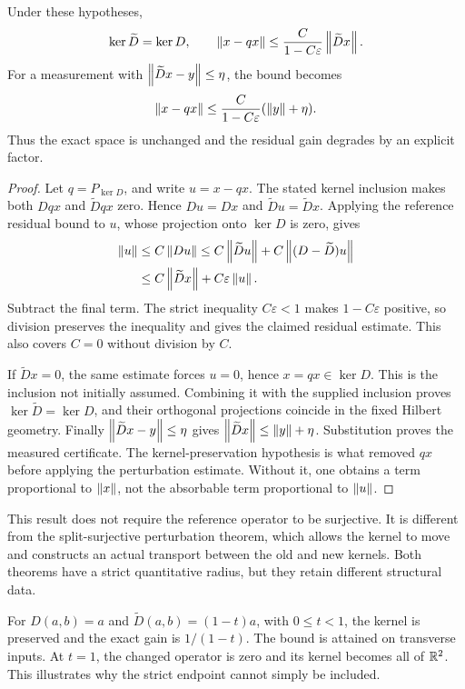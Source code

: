 \begin{theorem}\label{KS70}
Under these hypotheses,
\[
 \ker\widetilde D=\ker D,
 \qquad
 \left\lVert x-qx\right\rVert\le\frac{C}{1-C\varepsilon}\left\lVert\widetilde D x\right\rVert.
\]
For a measurement with \(\left\lVert\widetilde D x-y\right\rVert\le\eta\), the bound becomes
\[
 \left\lVert x-qx\right\rVert\le\frac{C}{1-C\varepsilon}(\left\lVert y\right\rVert+\eta).
\]
Thus the exact space is unchanged and the residual gain degrades by an explicit factor.
\end{theorem}
\begin{proof}
Let \(q=P_{\ker D}\), and write \(u=x-qx\). The stated kernel inclusion makes both \(Dqx\) and \(\widetilde Dqx\) zero. Hence \(Du=Dx\) and \(\widetilde Du=\widetilde Dx\). Applying the reference residual bound to \(u\), whose projection onto \(\ker D\) is zero, gives
\[
 \begin{aligned}
 \left\lVert u\right\rVert&\le C\left\lVert Du\right\rVert
 \le C\left\lVert\widetilde Du\right\rVert+C\left\lVert(D-\widetilde D)u\right\rVert\\
 &\le C\left\lVert\widetilde Dx\right\rVert+C\varepsilon\left\lVert u\right\rVert.
 \end{aligned}
\]
Subtract the final term. The strict inequality \(C\varepsilon<1\) makes \(1-C\varepsilon\) positive, so division preserves the inequality and gives the claimed residual estimate. This also covers \(C=0\) without division by \(C\).

If \(\widetilde Dx=0\), the same estimate forces \(u=0\), hence \(x=qx\in\ker D\). This is the inclusion not initially assumed. Combining it with the supplied inclusion proves \(\ker\widetilde D=\ker D\), and their orthogonal projections coincide in the fixed Hilbert geometry. Finally \(\left\lVert\widetilde Dx-y\right\rVert\le\eta\) gives \(\left\lVert\widetilde Dx\right\rVert\le\left\lVert y\right\rVert+\eta\). Substitution proves the measured certificate. The kernel-preservation hypothesis is what removed \(qx\) before applying the perturbation estimate. Without it, one obtains a term proportional to \(\left\lVert x\right\rVert\), not the absorbable term proportional to \(\left\lVert u\right\rVert\).
\end{proof}
This result does not require the reference operator to be surjective. It is different from the split-surjective perturbation theorem, which allows the kernel to move and constructs an actual transport between the old and new kernels. Both theorems have a strict quantitative radius, but they retain different structural data.

For \(D(a,b)=a\) and \(\widetilde D(a,b)=(1-t)a\), with \(0\le t<1\), the kernel is preserved and the exact gain is \(1/(1-t)\). The bound is attained on transverse inputs. At \(t=1\), the changed operator is zero and its kernel becomes all of \(\mathbb R^2\). This illustrates why the strict endpoint cannot simply be included.

